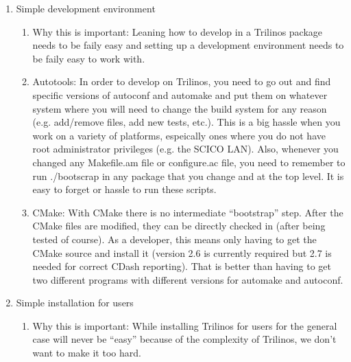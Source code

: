 \documentclass[pdf,ps2pdf,11pt]{SANDreport}
\begin{document}
\begin{enumerate}
\begin{enumerate}
  \end{enumerate}

{}\item Simple development environment

  \begin{enumerate}

  {}\item Why this is important: Leaning how to develop in a Trilinos
  package needs to be faily easy and setting up a development
  environment needs to be faily easy to work with.

  {}\item Autotools: In order to develop on Trilinos, you need to go
  out and find specific versions of autoconf and automake and put them
  on whatever system where you will need to change the build system
  for any reason (e.g. add/remove files, add new tests, etc.).  This
  is a big hassle when you work on a variety of platforms, espeically
  ones where you do not have root administrator privileges (e.g. the
  SCICO LAN).  Also, whenever you changed any Makefile.am file or
  configure.ac file, you need to remember to run ./bootscrap in any
  package that you change and at the top level.  It is easy to forget
  or hassle to run these scripts.

  {}\item CMake: With CMake there is no intermediate ``bootstrap''
  step.  After the CMake files are modified, they can be directly
  checked in (after being tested of course).  As a developer, this
  means only having to get the CMake source and install it (version
  2.6 is currently required but 2.7 is needed for correct CDash
  reporting).  That is better than having to get two different
  programs with different versions for automake and autoconf.

  \end{enumerate}

{}\item Simple installation for users

  \begin{enumerate}

  {}\item Why this is important: While installing Trilinos for users
  for the general case will never be ``easy'' because of the
  complexity of Trilinos, we don't want to make it too hard.


\end{enumerate}
\end{enumerate}
\end{document}
